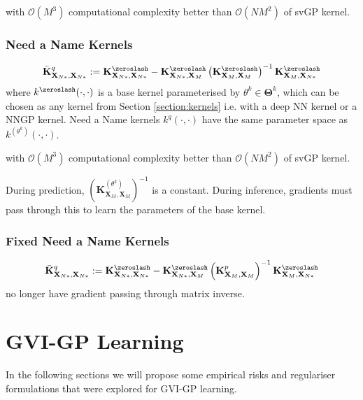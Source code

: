 \documentclass{article}
\numberwithin{equation}{section}
\begin{document}
with $\mathcal{O}(M^3)$ computational complexity better than $\mathcal{O}(NM^2)$ of svGP kernel.


\subsubsection{Need a Name Kernels}
\begin{align}
            \bar{\mathbf{K}}^q_{\mathbf{X}_{N*}, \mathbf{X}_{N*}} := \mathbf{K}^{\zeroslash}_{\mathbf{X}_{N*}, \mathbf{X}_{N*}} - \mathbf{K}^{\zeroslash}_{\mathbf{X}_{N*}, \mathbf{X}_M} \left( \mathbf{K}^{\zeroslash}_{\mathbf{X}_M, \mathbf{X}_M} \right)^{-1} \mathbf{K}^{\zeroslash}_{\mathbf{X}_M, \mathbf{X}_{N*}}
\end{align}
where $k^{\zeroslash}(\cdot, \cdot)$ is a base kernel parameterised by $\theta^k \in \boldsymbol{\Theta}^k$, which can be chosen as any kernel from Section \ref{section:kernels} i.e. with a deep NN kernel or a NNGP kernel. Need a Name kernels $k^q(\cdot, \cdot)$ have the same parameter space as $k^{(\theta^k)}(\cdot, \cdot)$.

with $\mathcal{O}(M^3)$ computational complexity better than $\mathcal{O}(NM^2)$ of svGP kernel.

During prediction, $\left( \mathbf{K}^{(\theta^k)}_{\mathbf{X}_M, \mathbf{X}_M} \right)^{-1}$ is a constant. During inference, gradients must pass through this to learn the parameters of the base kernel.

\subsubsection{Fixed Need a Name Kernels}
\begin{align}
            \bar{\mathbf{K}}^q_{\mathbf{X}_{N*}, \mathbf{X}_{N*}} := \mathbf{K}^{\zeroslash}_{\mathbf{X}_{N*}, \mathbf{X}_{N*}} - \mathbf{K}^{\zeroslash}_{\mathbf{X}_{N*}, \mathbf{X}_M} \left( \mathbf{K}^{p}_{\mathbf{X}_M, \mathbf{X}_M} \right)^{-1} \mathbf{K}^{\zeroslash}_{\mathbf{X}_M, \mathbf{X}_{N*}}
\end{align}
no longer have gradient passing through matrix inverse. 

\newpage
\section{GVI-GP Learning}\label{section:gvi-gp-learning}
In the following sections we will propose some empirical risks and regulariser formulations that were explored for GVI-GP learning.
\end{document}
